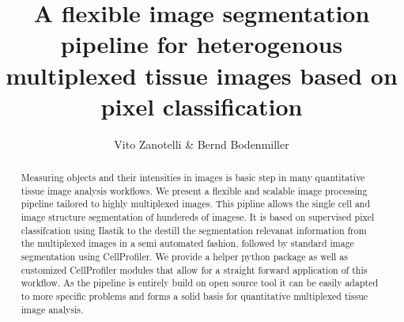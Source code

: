 \documentclass[a4paper]{article}
\title{A flexible image segmentation pipeline for heterogenous multiplexed tissue images based on pixel classification}
\author{Vito Zanotelli \& Bernd Bodenmiller}
\begin{document}
\maketitle

\begin{abstract}
Measuring objects and their intensities in images is basic step in many quantitative tissue image
analysis workflows. We present a flexible and scalable image processing pipeline tailored to
highly multiplexed images. This pipline allows the single cell and image structure segmentation of
hundereds of imagese. It is based on supervised pixel classifcation using Ilastik to the destill the
segmentation relevanat information from the multiplexed images in a semi automated fashion,
followed by standard image segmentation using CellProfiler. We provide a helper python package as
well as customized CellProfiler modules that allow for a straight forward application of this
workflow. As the pipeline is entirely build on open source tool it can be easily adapted to more
specific problems and forms a solid basis for quantitative multiplexed tissue image analysis.

\end{abstract}
\end{document}
